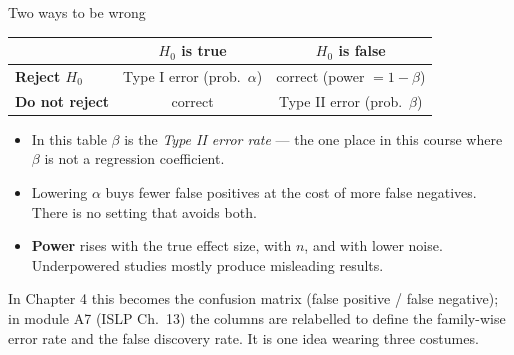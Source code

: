 \documentclass[aspectratio=169,11pt]{beamer}
\begin{document}
\begin{frame}{Two ways to be wrong}
  \footnotesize
  \begin{center}
  \begin{tabular}{@{}lcc@{}}
    \toprule
     & \textbf{$H_0$ is true} & \textbf{$H_0$ is false} \\
    \midrule
    \textbf{Reject $H_0$} & Type I error (prob.\ $\alpha$) & correct (power $=1-\beta$) \\
    \textbf{Do not reject} & correct & Type II error (prob.\ $\beta$) \\
    \bottomrule
  \end{tabular}
  \end{center}
  \begin{itemize}
    \item In this table $\beta$ is the \emph{Type II error rate} --- the one
          place in this course where $\beta$ is not a regression coefficient.
    \item Lowering $\alpha$ buys fewer false positives at the cost of more
          false negatives. There is no setting that avoids both.
    \item \textbf{Power} rises with the true effect size, with $n$, and with
          lower noise. Underpowered studies mostly produce misleading results.
  \end{itemize}
  \begin{takeaway}
    In Chapter 4 this becomes the confusion matrix (false positive / false
    negative); in module A7 (ISLP Ch.\ 13) the columns are relabelled to define the family-wise
    error rate and the false discovery rate. It is one idea wearing three
    costumes.
  \end{takeaway}
\end{frame}
\end{document}
